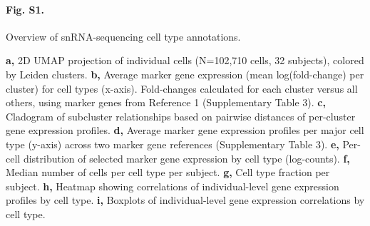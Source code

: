     \paragraph*{Fig. S1.} Overview of snRNA-sequencing cell type annotations.
    \textbf{a,} 2D UMAP projection of individual cells (N=102,710 cells, 32 subjects), colored by Leiden clusters.
    \textbf{b,} Average marker gene expression (mean log(fold-change) per cluster) for cell types (x-axis). Fold-changes calculated for each cluster versus all others, using marker genes from Reference 1 (Supplementary Table 3).
    \textbf{c,} Cladogram of subcluster relationships based on pairwise distances of per-cluster gene expression profiles.
    \textbf{d,} Average marker gene expression profiles per major cell type (y-axis) across two marker gene references (Supplementary Table 3).
    \textbf{e,} Per-cell distribution of selected marker gene expression by cell type (log-counts).
    \textbf{f,} Median number of cells per cell type per subject.
    \textbf{g,} Cell type fraction per subject.
    \textbf{h,} Heatmap showing correlations of individual-level gene expression profiles by cell type.
    \textbf{i,} Boxplots of individual-level gene expression correlations by cell type.
%

